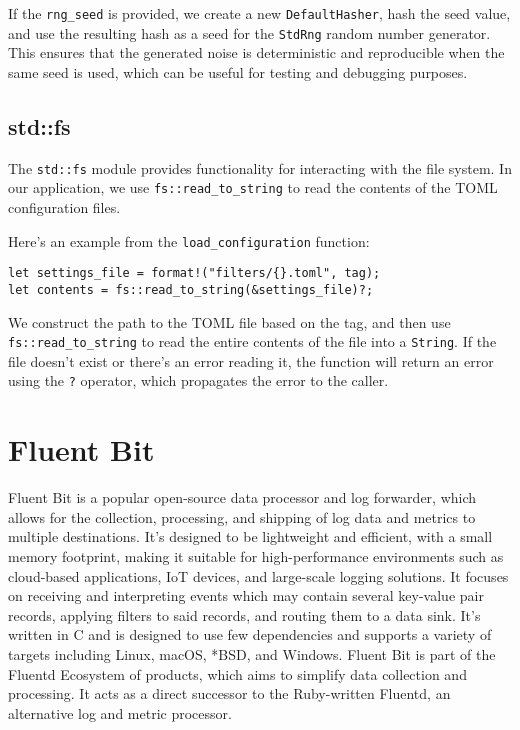 If the \texttt{rng_seed} is provided, we create a new \texttt{DefaultHasher}, hash the seed value, and use the resulting hash as a seed for the \texttt{StdRng} random number generator. This ensures that the generated noise is deterministic and reproducible when the same seed is used, which can be useful for testing and debugging purposes.

\subsection{std::fs}
The \texttt{std::fs} module provides functionality for interacting with the file system. In our application, we use \texttt{fs::read_to_string} to read the contents of the TOML configuration files.

Here's an example from the \texttt{load_configuration} function:

\begin{verbatim}
let settings_file = format!("filters/{}.toml", tag);
let contents = fs::read_to_string(&settings_file)?;
\end{verbatim}

We construct the path to the TOML file based on the tag, and then use \texttt{fs::read_to_string} to read the entire contents of the file into a \texttt{String}. If the file doesn't exist or there's an error reading it, the function will return an error using the \texttt{?} operator, which propagates the error to the caller.

\section{Fluent Bit}
Fluent Bit is a popular open-source data processor and log forwarder, which allows for the collection, processing, and shipping of log data and metrics to multiple destinations. It's designed to be lightweight and efficient, with a small memory footprint, making it suitable for high-performance environments such as cloud-based applications, IoT devices, and large-scale logging solutions. It focuses on receiving and interpreting events which may contain several key-value pair records, applying filters to said records, and routing them to a data sink. It's written in C and is designed to use few dependencies and supports a variety of targets including Linux, macOS, *BSD, and Windows. Fluent Bit is part of the Fluentd Ecosystem of products, which aims to simplify data collection and processing. It acts as a direct successor to the Ruby-written Fluentd, an alternative log and metric processor.

